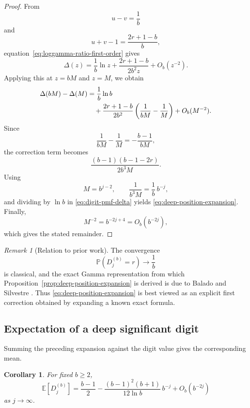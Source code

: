 \documentclass[11pt]{article}
\newtheorem{corollary}[theorem]{Corollary}
\theoremstyle{definition}
\theoremstyle{remark}
\newtheorem*{remark}{Remark}
\begin{document}
\begin{proof}
From
\[
    u-v=\frac1b
\]
and
\[
    u+v-1
    =
    \frac{2r+1-b}{b},
\]
equation~\eqref{eq:loggamma-ratio-first-order} gives
\begin{equation}
    \Delta(z)
    =
    \frac1b\ln z
    +
    \frac{2r+1-b}{2b^2z}
    +
    O_b(z^{-2}).
    \label{eq:delta-expansion}
\end{equation}
Applying this at \(z=bM\) and \(z=M\), we obtain
\begin{align}
    \Delta(bM)-\Delta(M)
    &=
    \frac1b\ln b
    \notag\\
    &\quad+
    \frac{2r+1-b}{2b^2}
    \left(
        \frac1{bM}-\frac1M
    \right)
    +
    O_b(M^{-2}).
    \label{eq:delta-difference}
\end{align}
Since
\[
    \frac1{bM}-\frac1M
    =
    -\frac{b-1}{bM},
\]
the correction term becomes
\[
    \frac{(b-1)(b-1-2r)}
         {2b^3M}.
\]
Using
\[
    M=b^{j-2},
    \qquad
    \frac{1}{b^3M}
    =
    \frac{1}{b}\,b^{-j},
\]
and dividing by \(\ln b\) in
\eqref{eq:digit-pmf-delta} yields
\eqref{eq:deep-position-expansion}.
Finally,
\[
    M^{-2}=b^{-2j+4}=O_b(b^{-2j}),
\]
which gives the stated remainder.
\end{proof}

\begin{remark}[Relation to prior work]
\label{rem:deep-position-prior-work}
The convergence
\[
    \mathbb P(D_j^{(b)}=r)\longrightarrow\frac1b
\]
is classical, and the exact Gamma representation from which
Proposition~\ref{prop:deep-position-expansion} is derived is due to
Balado and Silvestre
\cite{BaladoSilvestre2021,BaladoSilvestre2024}.
Thus
\eqref{eq:deep-position-expansion} is best viewed as an explicit
first correction obtained by expanding a known exact formula.
\end{remark}


\subsection{Expectation of a deep significant digit}
\label{subsec:mean-digit-asymptotics}

Summing the preceding expansion against the digit value gives the
corresponding mean.

\begin{corollary}
\label{cor:mean-digit-expansion}
For fixed \(b\ge2\),
\begin{equation}
\boxed{
    \mathbb E[D_j^{(b)}]
    =
    \frac{b-1}{2}
    -
    \frac{(b-1)^2(b+1)}
         {12\ln b}\,b^{-j}
    +
    O_b(b^{-2j})
}
\label{eq:mean-digit-expansion}
\end{equation}
as \(j\to\infty\).
\end{corollary}
\end{document}
